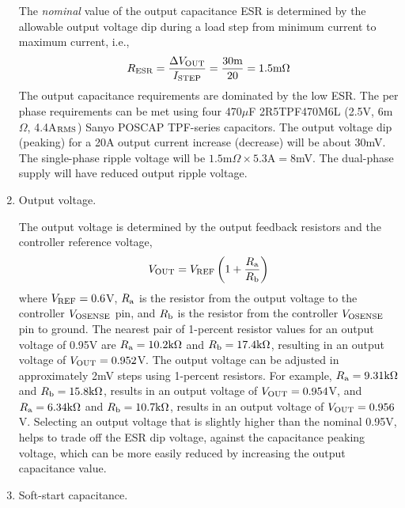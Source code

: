 \begin{enumerate}
The {\em nominal} value of the output capacitance ESR is determined by
the allowable output voltage dip during a load step from minimum current
to maximum current, i.e.,
%
\begin{equation}
R_{\rm ESR} = \frac{\Delta V_{\rm OUT}}{I_{\rm STEP}} = 
\frac{30\text{m}}{20} = 1.5\text{m}\Omega
\end{equation}
%
The output capacitance requirements are dominated by the low ESR.
The per phase requirements can be met using four 
470$\mu$F 2R5TPF470M6L (2.5V, 6m$\Omega$, 4.4A$_{\rm RMS}$)
Sanyo POSCAP TPF-series capacitors.
%
The output voltage dip (peaking) for a 20A output current increase
(decrease) will be about 30mV. The single-phase ripple voltage will
be $1.5\text{m}\Omega \times 5.3\text{A} = 8$mV.
The dual-phase supply will have reduced output ripple voltage.

\item Output voltage.

The output voltage is determined by the output feedback resistors
and the controller reference voltage, 
%
\begin{equation}
V_{\rm OUT} = V_{\rm REF}\left(1+\frac{R_{\rm a}}{R_{\rm b}}\right)
\end{equation}
%
where $V_{\rm REF} = 0.6$V, $R_{\rm a}$ is the resistor from the
output voltage to the controller $V_{\rm OSENSE}$ pin, and 
$R_{\rm b}$ is the resistor from the controller $V_{\rm OSENSE}$ 
pin to ground.
%
The nearest pair of 1-percent resistor values for an output voltage
of 0.95V are $R_{\rm a} = 10.2\text{k}\Omega$ and 
$R_{\rm b} = 17.4\text{k}\Omega$, resulting in an output
voltage of $V_{\rm OUT} = 0.952$V.
%
The output voltage can be adjusted in approximately 2mV steps
using 1-percent resistors. For example, $R_{\rm a} = 9.31\text{k}\Omega$ and 
$R_{\rm b} = 15.8\text{k}\Omega$, results in an output
voltage of $V_{\rm OUT} = 0.954$V, and 
$R_{\rm a} = 6.34\text{k}\Omega$ and 
$R_{\rm b} = 10.7\text{k}\Omega$, results in an output
voltage of $V_{\rm OUT} = 0.956$V.  
%
Selecting an output voltage that is slightly higher than the nominal
0.95V, helps to trade off the ESR dip voltage, against the capacitance
peaking voltage, which can be more easily reduced by increasing
the output capacitance value.

\item Soft-start capacitance.


\end{enumerate}
